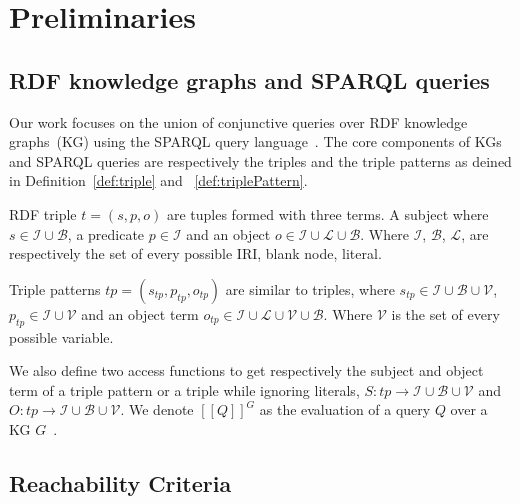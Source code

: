 \section{Preliminaries}\label{sec:preliminaries}

\subsection{RDF knowledge graphs and SPARQL queries}

Our work focuses on the union of conjunctive queries over RDF knowledge graphs~(KG) using the SPARQL query language~\cite{w3SPARQLQuery}.
The core components of KGs and SPARQL queries are respectively the triples and the triple patterns as deined in Definition~\ref{def:triple} and ~\ref{def:triplePattern}.

\begin{definition}[Triple]\label{def:triple}
    RDF triple $t = (s,p,o)$ are tuples formed with three terms. A subject where $s \in\mathcal{I} \cup \mathcal{B}$, a predicate $p \in \mathcal{I}$ and an object $o \in \mathcal{I} \cup \mathcal{L} \cup \mathcal{B}$.
    Where $\mathcal{I}$, $\mathcal{B}$, $\mathcal{L}$,  are respectively the set of every possible IRI, blank node, literal.
\end{definition}

\begin{definition}\label{def:triplePattern}
    Triple patterns $tp = (s_{tp}, p_{tp}, o_{tp})$ are similar to triples, where $s_{tp} \in \mathcal{I} \cup \mathcal{B} \cup \mathcal{V}$,
    $p_{tp} \in \mathcal{I} \cup \mathcal{V}$ and an object term  $o_{tp} \in \mathcal{I} \cup \mathcal{L} \cup \mathcal{V} \cup \mathcal{B}$.
    Where $\mathcal{V}$ is the set of every possible variable.
\end{definition}

We also define two access functions to get respectively the subject and object term of a triple pattern or a triple while ignoring literals,
$ S: tp \rightarrow \mathcal{I} \cup \mathcal{B} \cup \mathcal{V}$ and $O: tp \rightarrow \mathcal{I} \cup \mathcal{B} \cup \mathcal{V}$.
We denote $[\![ Q ]\!]^{G}$ as the evaluation of a query $Q$ over a KG $G$~\cite{Angles2008}.

\subsection{Reachability Criteria}

